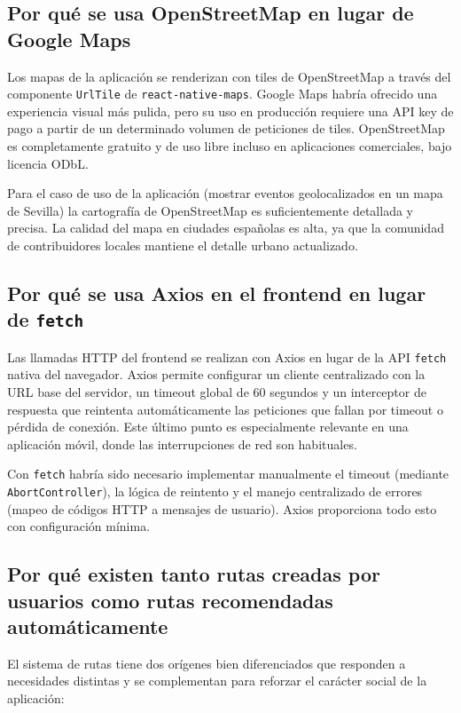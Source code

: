 \subsection{Por qué se usa OpenStreetMap en lugar de Google Maps}

Los mapas de la aplicación se renderizan con tiles de OpenStreetMap a través del componente \texttt{UrlTile} de \texttt{react-native-maps}. Google Maps habría ofrecido una experiencia visual más pulida, pero su uso en producción requiere una API key de pago a partir de un determinado volumen de peticiones de tiles. OpenStreetMap es completamente gratuito y de uso libre incluso en aplicaciones comerciales, bajo licencia ODbL.

Para el caso de uso de la aplicación (mostrar eventos geolocalizados en un mapa de Sevilla) la cartografía de OpenStreetMap es suficientemente detallada y precisa. La calidad del mapa en ciudades españolas es alta, ya que la comunidad de contribuidores locales mantiene el detalle urbano actualizado.

\subsection{Por qué se usa Axios en el frontend en lugar de \texttt{fetch}}

Las llamadas HTTP del frontend se realizan con Axios en lugar de la API \texttt{fetch} nativa del navegador. Axios permite configurar un cliente centralizado con la URL base del servidor, un timeout global de 60 segundos y un interceptor de respuesta que reintenta automáticamente las peticiones que fallan por timeout o pérdida de conexión. Este último punto es especialmente relevante en una aplicación móvil, donde las interrupciones de red son habituales.

Con \texttt{fetch} habría sido necesario implementar manualmente el timeout (mediante \texttt{AbortController}), la lógica de reintento y el manejo centralizado de errores (mapeo de códigos HTTP a mensajes de usuario). Axios proporciona todo esto con configuración mínima.

\subsection{Por qué existen tanto rutas creadas por usuarios como rutas recomendadas automáticamente}

El sistema de rutas tiene dos orígenes bien diferenciados que responden a necesidades distintas y se complementan para reforzar el carácter social de la aplicación:

